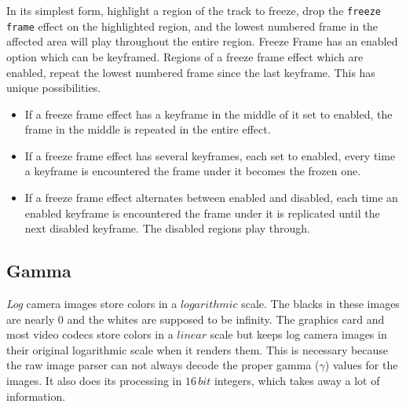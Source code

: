 In its simplest form, highlight a region of the track to freeze, drop the \texttt{freeze frame} effect on the highlighted region, and the lowest numbered frame in the affected area will play throughout the entire region. Freeze Frame has an enabled option which can be keyframed. Regions of a freeze frame effect which are enabled, repeat the lowest numbered frame since the last keyframe. This has unique possibilities.

\begin{itemize}
    \item If a freeze frame effect has a keyframe in the middle of it set to enabled, the frame in the middle is repeated in the entire effect.
    \item If a freeze frame effect has several keyframes, each set to enabled, every time a keyframe is encountered the frame under it becomes the frozen one.
    \item If a freeze frame effect alternates between enabled and disabled, each time an enabled keyframe is encountered the frame under it is replicated until the next disabled keyframe. The disabled regions play through.
\end{itemize}

\subsection{Gamma}%
\label{sub:gamma}

\textit{Log} camera images store colors in a $logarithmic$ scale. The blacks in these images are nearly $0$ and the whites are supposed to be infinity. The graphics card and most video codecs store colors in a $linear$ scale but \CGG{} keeps log camera images in their original logarithmic scale when it renders them. This is necessary because the raw image parser can not always decode the proper gamma ($\gamma$) values for the images. It also does its processing in $16\,bit$ integers, which takes away a lot of information.

